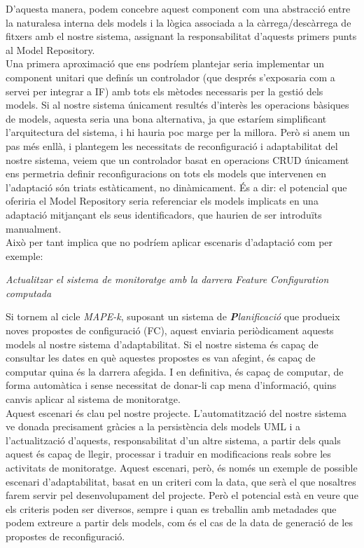 D'aquesta manera, podem concebre aquest component com una abstracció entre la naturalesa interna dels models i la lògica associada a la càrrega/descàrrega de fitxers amb el nostre sistema, assignant la responsabilitat d'aquests primers punts al Model Repository.\\

Una primera aproximació que ens podríem plantejar seria implementar un component unitari que definís un controlador (que després s'exposaria com a servei per integrar a IF) amb tots els mètodes necessaris per la gestió dels models. Si al nostre sistema únicament resultés d'interès les operacions bàsiques de models, aquesta seria una bona alternativa, ja que estaríem simplificant l'arquitectura del sistema, i hi hauria poc marge per la millora. Però si anem un pas més enllà, i plantegem les necessitats de reconfiguració i adaptabilitat del nostre sistema, veiem que un controlador basat en operacions CRUD únicament ens permetria definir reconfiguracions on tots els models que intervenen en l'adaptació són triats estàticament, no dinàmicament. És a dir: el potencial que oferiria el Model Repository seria referenciar els models implicats en una adaptació mitjançant els seus identificadors, que haurien de ser introduïts manualment.\\

Això per tant implica que no podríem aplicar escenaris d'adaptació com per exemple:\\

\centerline{\textit{Actualitzar el sistema de monitoratge amb la darrera Feature Configuration computada}}\bigskip

Si tornem al cicle \textit{MAPE-k}, suposant un sistema de \textit{\textbf{P}lanificació} que produeix noves propostes de configuració (FC), aquest enviaria periòdicament aquests models al nostre sistema d'adaptabilitat. Si el nostre sistema és capaç de consultar les dates en què aquestes propostes es van afegint, és capaç de computar quina és la darrera afegida. I en definitiva, és capaç de computar, de forma automàtica i sense necessitat de donar-li cap mena d'informació, quins canvis aplicar al sistema de monitoratge.\\

Aquest escenari és clau pel nostre projecte. L'automatització del nostre sistema ve donada precisament gràcies a la persistència dels models UML i a l'actualització d'aquests, responsabilitat d'un altre sistema, a partir dels quals aquest és capaç de llegir, processar i traduir en modificacions reals sobre les activitats de monitoratge. Aquest escenari, però, és només un exemple de possible escenari d'adaptabilitat, basat en un criteri com la data, que serà el que nosaltres farem servir pel desenvolupament del projecte. Però el potencial està en veure que els criteris poden ser diversos, sempre i quan es treballin amb metadades que podem extreure a partir dels models, com és el cas de la data de generació de les propostes de reconfiguració.\\

